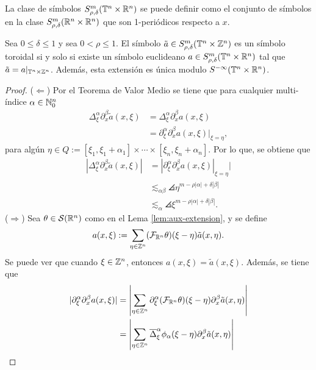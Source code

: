 \begin{remark}
	La clase de símbolos $S^m_{\rho,\delta}(\mathbb{T}^n\times\mathbb{R}^n)$ se puede definir como el conjunto de símbolos en la clase $S^m_{\rho,\delta}(\mathbb{R}^n\times\mathbb{R}^n)$ que son 1-periódicos respecto a $x$. 
\end{remark}
\begin{theorem}\label{theo:equivalence-symbols}
	Sea $0\leq\delta\leq1$ y sea $0<\rho\leq1$. El símbolo $\tilde{a}\in S^m_{\rho,\delta}(\mathbb{T}^n\times\mathbb{Z}^n)$ es un símbolo toroidal si y solo si existe un símbolo euclideano $a\in S^m_{\rho,\delta}(\mathbb{T}^n\times\mathbb{R}^n)$ tal que $\tilde{a} = a|_{\mathbb{T}^n\times\mathbb{Z}^n}$. Además, esta extensión es única modulo $S^{-\infty}(\mathbb{T}^n\times\mathbb{R}^n)$.
\end{theorem}
\begin{proof}
	($\Leftarrow$) Por el Teorema de Valor Medio se tiene que para cualquier multi-índice $\alpha\in\mathbb{N}_0^n$ 
	\begin{align*}
		\Delta^\alpha_\xi \partial^\beta_x \tilde{a}(x, \xi) &= \Delta^\alpha_\xi \partial^\beta_x {a}(x, \xi) \\
		& = \partial^\alpha_\xi \partial^\beta_x {a}(x, \xi)|_{\xi=\eta},
	\end{align*}
	para algún $\eta\in Q:= [\xi_1, \xi_1 + \alpha_1] \times \cdots\times[\xi_n, \xi_n+\alpha_n]$. Por lo que, se obtiene que 
	\begin{align*}
		|\Delta^\alpha_\xi \partial^\beta_x \tilde{a}(x, \xi)| & = |\partial^\alpha_\xi \partial^\beta_x {a}(x, \xi)|_{\xi=\eta}| \\
		& \lesssim_{\alpha\beta} \angles{\eta}^{m-\rho|\alpha|+\delta|\beta|} \\
		& \lesssim_\alpha \angles{\xi}^{m-\rho|\alpha|+\delta|\beta|}.
	\end{align*}
	($\Rightarrow$)  Sea $\theta\in\mathcal{S}(\mathbb{R}^n)$ como en el Lema \ref{lem:aux-extension}, y se define 
	\begin{equation*}
		a(x, \xi) := \sum_{\eta\in\mathbb{Z}^n} (\mathcal{F}_{\mathbb{R}^n}\theta)(\xi - \eta)\tilde{a}(x, \eta).
	\end{equation*}
	Se puede ver que cuando $\xi\in\mathbb{Z}^n$, entonces $a(x, \xi) = \tilde{a}(x, \xi)$. Además, se tiene que
	\begin{align*}
		|\partial^\alpha_\xi\partial^\beta_x a(x, \xi) | & = \left| \sum_{\eta\in\Z^n} \partial^\alpha_\xi(\mathcal{F}_{\R^n}\theta)(\xi - \eta)\partial^\beta_x\tilde{a}(x, \eta) \right| \\
		& = \left| \sum_{\eta\in\Z^n} \overline{\Delta}^\alpha_\xi\phi_\alpha(\xi-\eta)\partial^\beta_x\tilde{a}(x, \eta) \right|  \\

\end{align*}
\end{proof}

